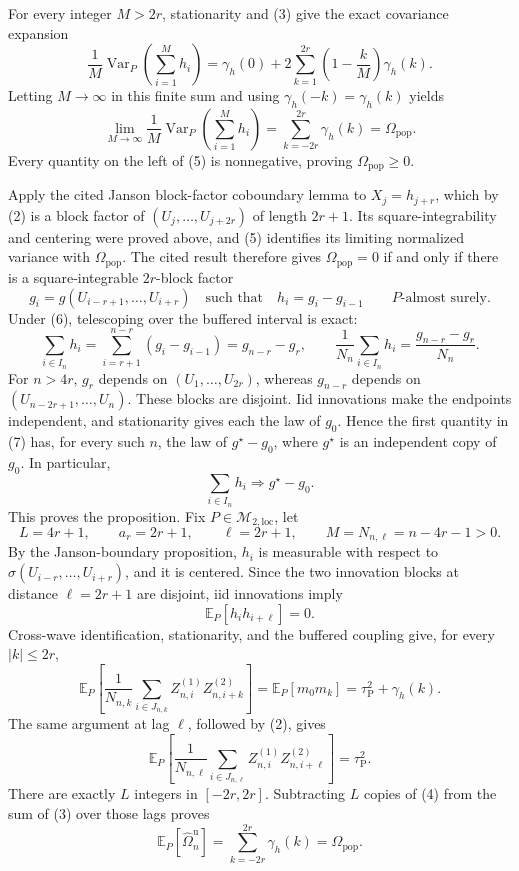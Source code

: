 For every integer \(M>2r\), stationarity and (3) give the exact covariance expansion
\[
 \frac1M\operatorname{Var}_P\!\left(\sum_{i=1}^Mh_i\right)
 =\gamma_h(0)+2\sum_{k=1}^{2r}
 \left(1-\frac{k}{M}\right)\gamma_h(k). \tag{4}
\]
Letting \(M\to\infty\) in this finite sum and using \(\gamma_h(-k)=\gamma_h(k)\) yields
\[
 \lim_{M\to\infty}\frac1M
 \operatorname{Var}_P\!\left(\sum_{i=1}^Mh_i\right)
 =\sum_{k=-2r}^{2r}\gamma_h(k)
 =\Omega_{\mathrm{pop}}. \tag{5}
\]
Every quantity on the left of (5) is nonnegative, proving \(\Omega_{\mathrm{pop}}\ge0\).

Apply the cited Janson block-factor coboundary lemma to \(X_j=h_{j+r}\), which by (2) is a block factor of \((U_j,\ldots,U_{j+2r})\) of length \(2r+1\).  Its square-integrability and centering were proved above, and (5) identifies its limiting normalized variance with \(\Omega_{\mathrm{pop}}\).  The cited result therefore gives \(\Omega_{\mathrm{pop}}=0\) if and only if there is a square-integrable \(2r\)-block factor
\[
 g_i=g(U_{i-r+1},\ldots,U_{i+r})
 \quad\text{such that}\quad
 h_i=g_i-g_{i-1}
 \qquad P\text{-almost surely}. \tag{6}
\]
Under (6), telescoping over the buffered interval is exact:
\[
 \sum_{i\in I_n}h_i
 =\sum_{i=r+1}^{n-r}(g_i-g_{i-1})
 =g_{n-r}-g_r,
 \qquad
 \frac1{N_n}\sum_{i\in I_n}h_i
 =\frac{g_{n-r}-g_r}{N_n}. \tag{7}
\]
For \(n>4r\), \(g_r\) depends on \((U_1,\ldots,U_{2r})\), whereas \(g_{n-r}\) depends on \((U_{n-2r+1},\ldots,U_n)\).  These blocks are disjoint.  Iid innovations make the endpoints independent, and stationarity gives each the law of \(g_0\).  Hence the first quantity in (7) has, for every such \(n\), the law of \(g^\star-g_0\), where \(g^\star\) is an independent copy of \(g_0\).  In particular,
\[
 \sum_{i\in I_n}h_i\Rightarrow g^\star-g_0.
\]
This proves the proposition.
Fix \(P\in\mathcal M_{2,\mathrm{loc}}\), let
\[
 L=4r+1,
 \qquad a_r=2r+1,
 \qquad \ell=2r+1,
 \qquad M=N_{n,\ell}=n-4r-1>0. \tag{1}
\]
By the Janson-boundary proposition, \(h_i\) is measurable with respect to \(\sigma(U_{i-r},\ldots,U_{i+r})\), and it is centered.  Since the two innovation blocks at distance \(\ell=2r+1\) are disjoint, iid innovations imply
\[
 \mathbb E_P[h_i h_{i+\ell}]=0. \tag{2}
\]
Cross-wave identification, stationarity, and the buffered coupling give, for every \(|k|\le2r\),
\[
 \mathbb E_P\!\left[
  \frac1{N_{n,k}}\sum_{i\in J_{n,k}}
  Z_{n,i}^{(1)}Z_{n,i+k}^{(2)}
 \right]
 =\mathbb E_P[m_0m_k]
 =\tau_{\mathrm P}^2+\gamma_h(k). \tag{3}
\]
The same argument at lag \(\ell\), followed by (2), gives
\[
 \mathbb E_P\!\left[
  \frac1{N_{n,\ell}}\sum_{i\in J_{n,\ell}}
  Z_{n,i}^{(1)}Z_{n,i+\ell}^{(2)}
 \right]
 =\tau_{\mathrm P}^2. \tag{4}
\]
There are exactly \(L\) integers in \([-2r,2r]\).  Subtracting \(L\) copies of (4) from the sum of (3) over those lags proves
\[
 \mathbb E_P[\widehat\Omega_n^{\mathrm u}]
 =\sum_{k=-2r}^{2r}\gamma_h(k)
 =\Omega_{\mathrm{pop}}. \tag{5}
\]

